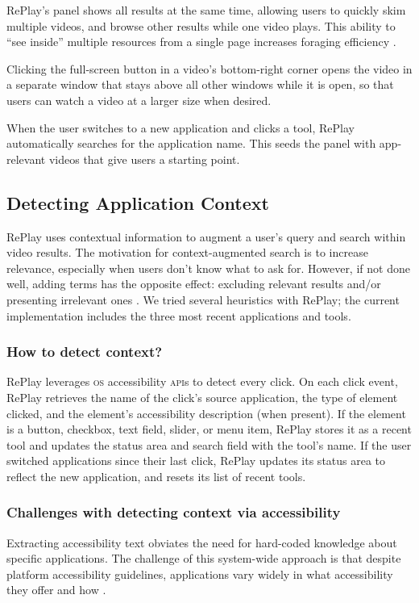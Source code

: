 RePlay's panel shows all results at the same time, allowing users to quickly skim multiple videos, and browse other results while one video plays. This ability to ``see inside'' multiple resources from a single page increases foraging efficiency \cite{Vermette2017, Glassman2016DocMatrix, Pavel2013}. 

Clicking the full-screen button in a video's bottom-right corner opens the video in a separate window that stays above all other windows while it is open, so that users can watch a video at a larger size when desired.

When the user switches to a new application and clicks a tool, RePlay automatically searches for the application name. This seeds the panel with app-relevant videos that give users a starting point.

\subsection{Detecting Application Context}
RePlay uses contextual information to augment a user's query and search within video results. The motivation for context-augmented search is to increase relevance, especially when users don't know what to ask for. However, if not done well, adding terms has the opposite effect: excluding relevant results and/or presenting irrelevant ones \cite{Finkelstein2002}. We tried several heuristics with RePlay; the current implementation includes the three most recent applications and tools.

\subsubsection{How to detect context?}
RePlay leverages \textsc{os} accessibility \textsc{api}s to detect every click. On each click event, RePlay retrieves the name of the click's source application, the type of element clicked, and the element's accessibility description (when present). If the element is a button, checkbox, text field, slider, or menu item, RePlay stores it as a recent tool and updates the status area and search field with the tool's name. If the user switched applications since their last click, RePlay updates its status area to reflect the new application, and resets its list of recent tools.

\subsubsection{Challenges with detecting context via accessibility}
Extracting accessibility text obviates the need for hard-coded knowledge about specific applications. The challenge of this system-wide approach is that despite platform accessibility guidelines, applications vary widely in what accessibility they offer and how \cite{Hurst2010}.

